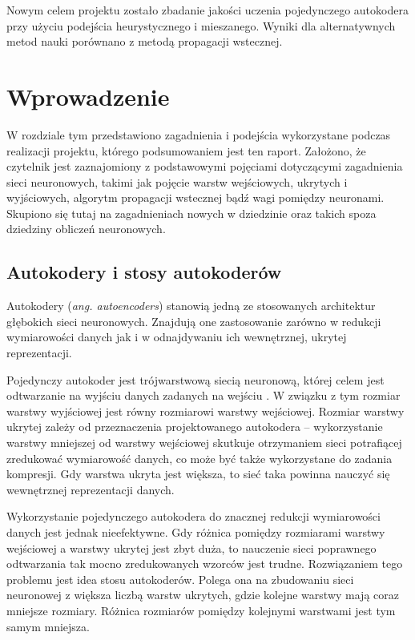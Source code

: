 \documentclass[11pt,a4paper,oneside]{report}
\begin{document}
Nowym celem projektu zostało zbadanie jakości uczenia pojedynczego autokodera przy użyciu podejścia heurystycznego i mieszanego. Wyniki dla alternatywnych metod nauki porównano z metodą propagacji wstecznej.

\chapter{Wprowadzenie}
\label{chap:introduction}

W rozdziale tym przedstawiono zagadnienia i podejścia wykorzystane podczas realizacji projektu, którego podsumowaniem jest ten raport. Założono, że czytelnik jest zaznajomiony z podstawowymi pojęciami dotyczącymi zagadnienia sieci neuronowych, takimi jak pojęcie warstw wejściowych, ukrytych i wyjściowych, algorytm propagacji wstecznej bądź wagi pomiędzy neuronami. Skupiono się tutaj na zagadnieniach nowych w dziedzinie oraz takich spoza dziedziny obliczeń neuronowych.

\section{Autokodery i stosy autokoderów}
\label{sec:autoencoders}

Autokodery (\textit{ang. autoencoders}) stanowią jedną ze stosowanych architektur głębokich sieci neuronowych. Znajdują one zastosowanie zarówno w redukcji wymiarowości danych jak i w odnajdywaniu ich wewnętrznej, ukrytej reprezentacji. 

Pojedynczy autokoder jest trójwarstwową siecią neuronową, której celem jest odtwarzanie na wyjściu danych zadanych na wejściu \cite{hinton2006reducing}. W związku z tym rozmiar warstwy wyjściowej jest równy rozmiarowi warstwy wejściowej. Rozmiar warstwy ukrytej zależy od przeznaczenia projektowanego autokodera -- wykorzystanie warstwy mniejszej od warstwy wejściowej skutkuje otrzymaniem sieci potrafiącej zredukować wymiarowość danych, co może być także wykorzystane do zadania kompresji. Gdy warstwa ukryta jest większa, to sieć taka powinna nauczyć się wewnętrznej reprezentacji danych.

Wykorzystanie pojedynczego autokodera do znacznej redukcji wymiarowości danych jest jednak nieefektywne. Gdy różnica pomiędzy rozmiarami warstwy wejściowej a warstwy ukrytej jest zbyt duża, to nauczenie sieci poprawnego odtwarzania tak mocno zredukowanych wzorców jest trudne. Rozwiązaniem tego problemu jest idea stosu autokoderów. Polega ona na zbudowaniu sieci neuronowej z większa liczbą warstw ukrytych, gdzie kolejne warstwy mają coraz mniejsze rozmiary. Różnica rozmiarów pomiędzy kolejnymi warstwami jest tym samym mniejsza.
\end{document}
